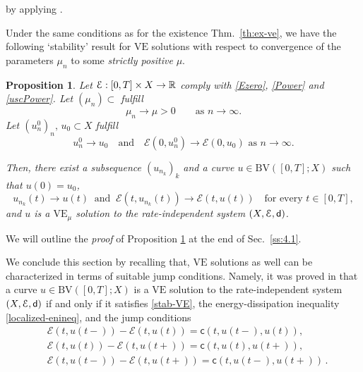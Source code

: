 \documentclass[a4paper,10pt,reqno]{amsart} %
\newcommand{\R}{\mathbb{R}}
\newtheorem{proposition}[theorem]{Proposition}
\numberwithin{equation}{section}
\newcommand{\Xs}{X}
\newcommand{\BV}{\mathrm{BV}}
\newcommand{\mdn}{\mathsf{d}}
\newcommand{\ene}[2]{\mathcal{E}(#1,#2)}
\newcommand{\lli}[2]{{#1}({#2}{-})}
\newcommand{\rli}[2]{{#1}({#2}{+})}
\newcommand{\vecost}[3]{\mathsf{c}(#1,#2,#3)}
\newcommand{\RIS}{(\Xs,\calE,\mdn)}
\newcommand{\VE}{\mathrm{VE}}
\begin{document}
by applying \cite[Lemma 6.2]{SavMin16}.
\par
 Under the same conditions as for the existence Thm.\ \ref{th:ex-ve}, we have the following `stability' result 
 for $\VE$ solutions with respect to convergence of the parameters $\mu_n$ to some \emph{strictly positive} $\mu$.
 \begin{proposition}
 \label{prop:added} 
   Let $\calE: [0,T]\times \Xs \to \R$ comply with  \eqref{Ezero}, \eqref{Power} and \eqref{uscPower}.   Let $(\mu_n) \subset$ fulfill 
   \[
   \mu_n\to \mu>0 \qquad \text{as $n\to\infty$}.
   \]
   Let $(u_n^0)_n,\, u_0 \subset \Xs$ fulfill 
    \begin{equation}
  \label{conv+en-conv_init}
  u_n^0 \to u_0 \quad \text{and} \quad  \ene 0{u_n^0} \to \ene 0{u_0} \text{ as $n\to\infty$}.
  \end{equation}
   \par
     Then,  there exist  a subsequence $(u_{n_k})_k$  and a curve $u\in \BV([0,T];\Xs)$ such that $u(0)=u_0$,
 \begin{equation}
\label{ptw+en-conv}
 u_{n_k}(t) \to u(t)  \ \text{ and } \ \ene {t}{u_{n_k}(t)} \to \ene t{u(t)} \quad \text{for every } t \in [0,T],
\end{equation}
and $u$ is a $\VE_\mu$ solution to the rate-independent system $\RIS$. 
 \end{proposition}
 We will outline the \emph{proof} of Proposition \ref{prop:added} at the end of Sec.\ \ref{ss:4.1}. 
\par
We conclude this section by recalling that,  $\VE$ solutions as well can be characterized in terms of  suitable jump conditions. Namely, it was proved in \cite[Prop.\ 3.8]{SavMin16} that a curve $u\in \BV([0,T];\Xs)$ is a $\VE$ solution to the rate-independent system $\RIS$ if and only if it satisfies \eqref{stab-VE}, the energy-dissipation inequality 
\eqref{localized-enineq},
and the jump conditions 
\begin{equation}
\begin{aligned}
\label{ve-jump-cond}
&
\ene t{\lli u t } - \ene t{u(t)} = \vecost t{\lli ut}{u(t)},
\\
&
\ene t{ u (t) } - \ene t{\rli u t } = \vecost t{u(t)}{\rli u t},
\\
&
\ene t{\lli u t } - \ene t{\rli ut}  = \vecost t{\lli ut}{\rli u t}\,.
\end{aligned}
\end{equation}
\end{document}
